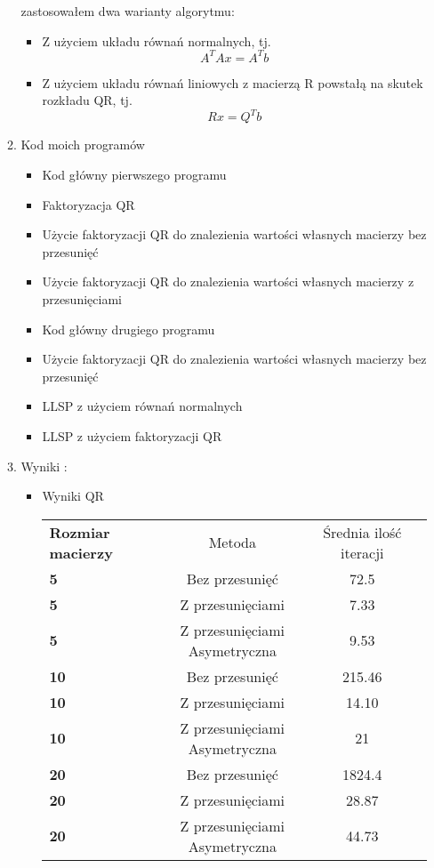 \documentclass[a4paper, 11pt]{article}
\begin{document}
\begin{enumerate}
\begin{enumerate}
zastosowałem dwa warianty algorytmu:
\begin{itemize}
\item Z użyciem układu równań normalnych, tj. \[ A^{T}Ax = A^{T}b\]
\item Z użyciem układu równań liniowych z macierzą R powstałą na skutek rozkładu QR, tj.
\[ Rx = Q^{T}b\]
\end{itemize}
\item Kod moich programów 
\begin{itemize}
\item Kod główny pierwszego programu

\item Faktoryzacja QR

\item Użycie faktoryzacji QR do znalezienia wartości własnych macierzy bez przesunięć

\item Użycie faktoryzacji QR do znalezienia wartości własnych macierzy z przesunięciami

\item Kod główny drugiego programu
\item Użycie faktoryzacji QR do znalezienia wartości własnych macierzy bez przesunięć

\item LLSP z użyciem równań normalnych

\item LLSP z użyciem faktoryzacji QR

\end{itemize}
\item
Wyniki : 
\begin{itemize}
\item Wyniki QR
\begin{center}
\begin{tabular}{ l*{2}{c}r}
\hline
\bfseries Rozmiar macierzy & Metoda & Średnia ilość iteracji \\
\bfseries 5 & Bez przesunięć & 72.5\\
\bfseries 5 & Z przesunięciami & 7.33\\
\bfseries 5 & Z przesunięciami Asymetryczna & 9.53\\
\bfseries 10 & Bez przesunięć & 215.46\\
\bfseries 10 & Z przesunięciami & 14.10\\
\bfseries 10 & Z przesunięciami Asymetryczna & 21\\
\bfseries 20 & Bez przesunięć & 1824.4\\
\bfseries 20 & Z przesunięciami & 28.87\\
\bfseries 20 & Z przesunięciami Asymetryczna & 44.73\\
\hline  
\end{tabular}
\end{center}
\bigskip


\end{itemize}
\end{enumerate}
\end{enumerate}
\end{document}
